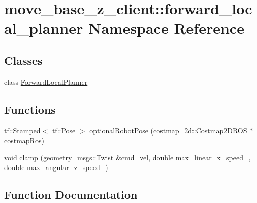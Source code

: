 \hypertarget{namespacemove__base__z__client_1_1forward__local__planner}{}\section{move\+\_\+base\+\_\+z\+\_\+client\+:\+:forward\+\_\+local\+\_\+planner Namespace Reference}
\label{namespacemove__base__z__client_1_1forward__local__planner}
\subsection*{Classes}
\begin{DoxyCompactItemize}
\item 
class \hyperlink{classmove__base__z__client_1_1forward__local__planner_1_1ForwardLocalPlanner}{Forward\+Local\+Planner}
\end{DoxyCompactItemize}
\subsection*{Functions}
\begin{DoxyCompactItemize}
\item 
tf\+::\+Stamped$<$ tf\+::\+Pose $>$ \hyperlink{namespacemove__base__z__client_1_1forward__local__planner_a683a39a154ed5aa179fdb1afb7bfe2e4}{optional\+Robot\+Pose} (costmap\+\_\+2d\+::\+Costmap2\+D\+R\+OS $\ast$costmap\+Ros)
\item 
void \hyperlink{namespacemove__base__z__client_1_1forward__local__planner_a5d0513634a69cbd890b025cd3731d687}{clamp} (geometry\+\_\+msgs\+::\+Twist \&cmd\+\_\+vel, double max\+\_\+linear\+\_\+x\+\_\+speed\+\_\+, double max\+\_\+angular\+\_\+z\+\_\+speed\+\_\+)
\end{DoxyCompactItemize}


\subsection{Function Documentation}
\mbox{\label{namespacemove__base__z__client_1_1forward__local__planner_a5d0513634a69cbd890b025cd3731d687}} 
